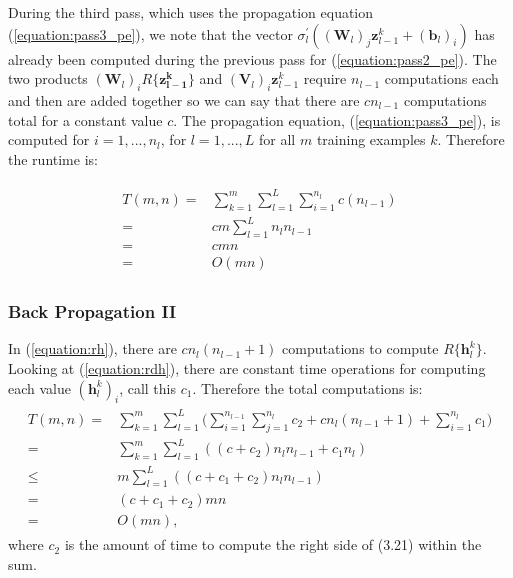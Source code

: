 \documentclass[letterpaper,12pt,titlepage,oneside,final]{book}
\begin{document}
	During the third pass, which uses the propagation equation (\ref{equation:pass3_pe}), we note that the vector $\sigma_{l}^{\prime}((\mathbf{W}_{l})_{j}\mathbf{z}_{l-1}^{k} + (\mathbf{b}_{l})_{i})$ has already been computed during the previous pass for (\ref{equation:pass2_pe}). The two products $(\mathbf{W}_{l})_{i}R\{\mathbf{z_{l-1}^{k}}\}$ and  $(\mathbf{V}_{l})_{i}\mathbf{z}_{l-1}^{k}$ require $n_{l-1}$ computations each and then are added together so we can say that there are $cn_{l-1}$ computations total for a constant value $c$. The propagation equation, (\ref{equation:pass3_pe}), is computed for $i=1,...,n_{l}$, for $l=1,...,L$ for all $m$ training examples $k$. Therefore the runtime is:
	
	\begin{align}
	\begin{split}
	T(m,n) = & \sum_{k=1}^{m}{\sum_{l=1}^{L}{\sum_{i=1}^{n_l}{c(n_{l-1})}}} \\
	= & cm\sum_{l=1}^{L}{n_{l}n_{l-1}} \\
	= & cmn \\
	= & O(mn)
	\end{split}
	\end{align}
	
	\subsubsection{Back Propagation II}
	
	In (\ref{equation:rh}), there are $cn_{l}(n_{l-1}+1)$ computations to compute $ R\{\mathbf{h}_{l}^{k}\} $. Looking at (\ref{equation:rdh}), there are constant time operations for computing each value $(\mathbf{h}_{l}^{k})_{i}$, call this $c_{1}$. Therefore the total computations is:
	\begin{align}
	\begin{split}
	T(m,n) = & \sum_{k=1}^{m}{\sum_{l=1}^{L}{(\sum_{i=1}^{n_{l-1}}{\sum_{j=1}^{n_l}{c_{2}}} + cn_{l}(n_{l-1}+1) + \sum_{i=1}^{n_l}{c_{1}}})} \\
	= & \sum_{k=1}^{m}{\sum_{l=1}^{L}{((c + c_{2})n_{l}n_{l-1} + c_{1}n_{l})}} \\
	\leq & m\sum_{l=1}^{L}{((c + c_{1} + c_{2})n_{l}n_{l-1})} \\ 
	= & (c + c_{1} + c_{2})mn \\ 
	= & O(mn),
	\end{split} 
	\end{align}
	where $c_{2}$ is the amount of time to compute the right side of (3.21) within the sum.
	
\end{document}
